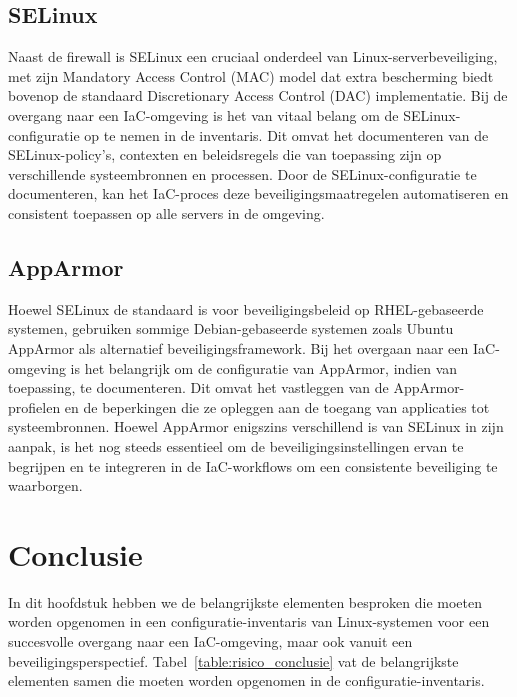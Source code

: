 \subsection{SELinux}
\label{risico_selinux}

Naast de firewall is SELinux een cruciaal onderdeel van Linux-serverbeveiliging, met zijn Mandatory Access Control (MAC) model dat extra bescherming biedt bovenop de standaard Discretionary Access Control (DAC) implementatie.
Bij de overgang naar een IaC-omgeving is het van vitaal belang om de SELinux-configuratie op te nemen in de inventaris.
Dit omvat het documenteren van de SELinux-policy's, contexten en beleidsregels die van toepassing zijn op verschillende systeembronnen en processen.
Door de SELinux-configuratie te documenteren, kan het IaC-proces deze beveiligingsmaatregelen automatiseren en consistent toepassen op alle servers in de omgeving.

\subsection{AppArmor}
\label{risico_apparmor}

Hoewel SELinux de standaard is voor beveiligingsbeleid op RHEL-gebaseerde systemen, gebruiken sommige Debian-gebaseerde systemen zoals Ubuntu AppArmor als alternatief beveiligingsframework.
Bij het overgaan naar een IaC-omgeving is het belangrijk om de configuratie van AppArmor, indien van toepassing, te documenteren.
Dit omvat het vastleggen van de AppArmor-profielen en de beperkingen die ze opleggen aan de toegang van applicaties tot systeembronnen.
Hoewel AppArmor enigszins verschillend is van SELinux in zijn aanpak, is het nog steeds essentieel om de beveiligingsinstellingen ervan te begrijpen en te integreren in de IaC-workflows om een consistente beveiliging te waarborgen.

\section{Conclusie}
\label{risico_conclusie}

In dit hoofdstuk hebben we de belangrijkste elementen besproken die moeten worden opgenomen in een configuratie-inventaris van Linux-systemen voor een succesvolle overgang naar een IaC-omgeving, maar ook vanuit een beveiligingsperspectief.
Tabel~\ref{table:risico_conclusie} vat de belangrijkste elementen samen die moeten worden opgenomen in de configuratie-inventaris.

